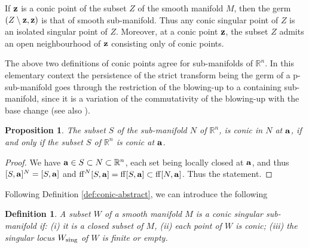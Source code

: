 \documentclass[11pt]{amsart}
\newtheorem{proposition}[theorem]{Proposition}
\newtheorem{definition}[theorem]{Definition}
\newcommand{\field}[1]{\mathbb{#1}}
\newcommand{\R}{\field{R}}
\newcommand{\ba}{{\bf a}}
\newcommand{\bz}{{\bf z}}
\newcommand{\ff}{{\rm ff}}
\newcommand{\Rn}{{\R^n}}
\newcommand{\sing}{{\rm sing}}
\numberwithin{equation}{section}
\numberwithin{equation}{section}
\begin{document}
If $\bz$ is a conic point of the subset $Z$ of the smooth manifold $M$,
then the germ $(Z\setminus \bz,\bz)$ is that of smooth sub-manifold. 
Thus any conic singular point of $Z$ is an isolated singular point of $Z$. 
Moreover, at a conic point $\bz$, the subset $Z$ admits an open neighbourhood of $\bz$ consisting only of conic points. 

The above two definitions of conic points agree for sub-manifolds of 
$\Rn$. In this elementary context the persistence of the strict transform being 
the germ of a p-sub-manifold goes through the restriction of the blowing-up to 
a containing sub-manifold, since it is a variation of the commutativity of the 
blowing-up with the base change (see also \cite[Chapter V]{Mel}).
%
%
\begin{proposition}\label{claim:conic-N-conic}
	The subset $S$ of the sub-manifold $N$ of $\Rn$, is conic in $N$ at $\ba$, if and only if the subset $S$ of $\Rn$ is conic at $\ba$. 
\end{proposition}
%
%
\begin{proof}
We have $\ba \in S \subset N \subset \Rn$, each set being locally closed at 
$\ba$, and thus $[S,\ba]^N = [S,\ba]$ and $\ff^N[S,\ba] = \ff[S,\ba] \subset 
\ff[N,\ba]$. Thus the statement.
\end{proof}
%

%
%
Following Definition \ref{def:conic-abstract}, we can introduce the following
%
%
%
\begin{definition}\label{def:conic-singular sub-manifold}
	A subset $W$ of a smooth manifold $M$ is a \em conic singular sub-manifold \em  if: (i) it is a closed subset of $M$, (ii) each point of $W$ is conic; (iii) the singular locus $W_\sing$ of $W$ is finite or empty. 
\end{definition}
%	
%
%
%
	
\end{document}
